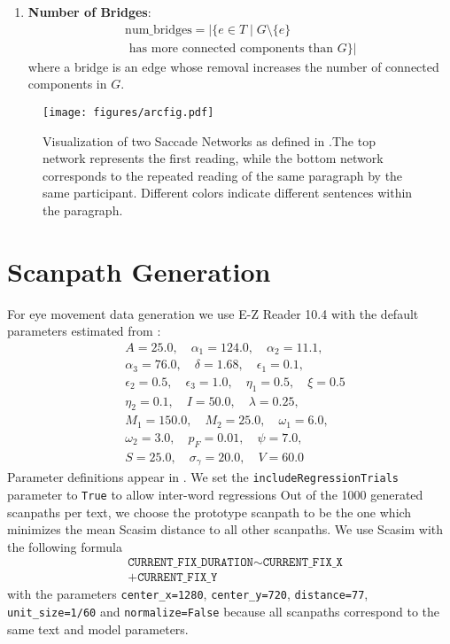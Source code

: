 \begin{enumerate}
    \item \textbf{Number of Bridges}:
    \begin{equation*}
\begin{aligned}
    \text{num\_bridges} = |\{e \in T \mid G \setminus \{e\} \\ \text{ has more connected components than } G\}|
\end{aligned}
\end{equation*}
    where a bridge is an edge whose removal increases the number of connected components in \( G \).
\end{enumerate}

\begin{figure*}
    \centering
    \texttt{[image: figures/arcfig.pdf]}
    \caption{Visualization of two Saccade Networks as defined in .The top network represents the first reading, while the bottom network corresponds to the repeated reading of the same paragraph by the same participant. Different colors indicate different sentences within the paragraph.}
    \label{fig:sacc-net-viz}
\end{figure*}



\section{Scanpath Generation}
\label{app:synthesis_details}
For eye movement data generation we use \mbox{E-Z} Reader 10.4 \cite{veldre2023understanding} with the default parameters estimated from \cite{schilling1998comparing}:
\begin{align*}
    &A = 25.0, \quad \alpha_1 = 124.0, \quad \alpha_2 = 11.1,\\
    &\alpha_3 = 76.0, \quad \delta = 1.68, \quad \epsilon_1 = 0.1,\\
    &\epsilon_2 = 0.5, \quad \epsilon_3 = 1.0, \quad \eta_1 = 0.5, \quad \xi = 0.5\\
    &\eta_2 = 0.1, \quad I = 50.0, \quad \lambda = 0.25,\\
    &M_1 = 150.0, \quad M_2 = 25.0, \quad \omega_1 = 6.0,\\
    &\omega_2 = 3.0, \quad p_F = 0.01, \quad \psi = 7.0,\\
    &S = 25.0, \quad \sigma_{\gamma} = 20.0, \quad V = 60.0
\end{align*}
Parameter definitions appear in \cite{reichle_using_2013}. We set the  \texttt{includeRegressionTrials} parameter to \texttt{True} to allow inter-word regressions Out of the 1000 generated scanpaths per text, we choose the prototype scanpath to be the one which minimizes the mean Scasim \cite{von2011scanpath} distance to all other scanpaths. We use Scasim with the following formula 
\begin{align*}
    &\texttt{CURRENT\_FIX\_DURATION} \sim
    \texttt{CURRENT\_FIX\_X}\\
    & + \texttt{CURRENT\_FIX\_Y}
\end{align*}
with the parameters \texttt{center\_x=1280}, \texttt{center\_y=720}, \texttt{distance=77}, \texttt{unit\_size=1/60} and \texttt{normalize=False} because all scanpaths correspond to the same text and model parameters.

